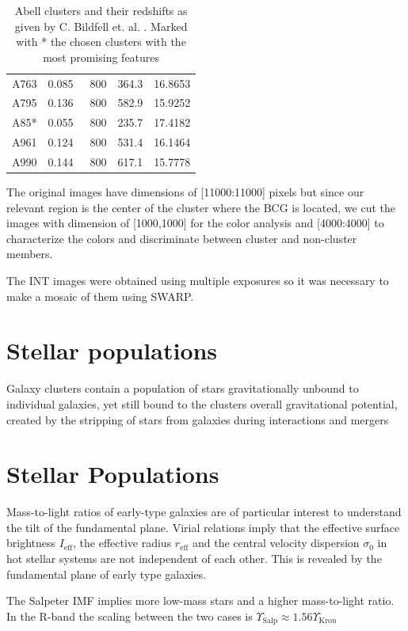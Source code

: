 \begin{table}[]
\begin{tabular}{ccccc}
A763    & 0.085 & ~800           & 364.3 & 16.8653   \\
A795    & 0.136 & ~800           & 582.9 & 15.9252   \\
A85*    & 0.055 & ~800           & 235.7 & 17.4182   \\
A961    & 0.124 & ~800           & 531.4 & 16.1464   \\
A990    & 0.144 & ~800           & 617.1 & 15.7778   
\end{tabular}
\caption[Abell Clusters and their redshift]{Abell clusters and their redshifts as given by C. Bildfell et. al. \citeyear{Reference6}. Marked with * the chosen clusters with the most promising features}
\end{table}

The original images have dimensions of [11000:11000] pixels but since our relevant region is the center of the cluster where the BCG is located, we cut the images with dimension of [1000,1000] for the color analysis and [4000:4000] to characterize the colors and discriminate between cluster and non-cluster members.

The INT images were obtained using multiple exposures so it was necessary to make a mosaic of them using SWARP.

\section{Stellar populations}
 
Galaxy clusters contain a population of stars gravitationally unbound to individual galaxies, yet still bound to the clusters overall gravitational potential, created by the stripping of stars from galaxies during interactions and mergers

\section{Stellar Populations}

Mass-to-light ratios of early-type galaxies are of particular interest to understand the tilt of the fundamental plane. Virial relations imply that the effective surface brightness $I_{\text{eff}}$, the effective radius $r_{\text{eff}}$ and the central velocity dispersion $\sigma_{0}$ in hot stellar systems are not independent of each other. This is revealed by the fundamental plane of early type galaxies.

The Salpeter IMF implies more low-mass stars and a higher mass-to-light ratio. In the R-band the scaling between the two cases is $\Upsilon_{\text{Salp}}\approx 1.56\Upsilon_{\text{Krou}}$

